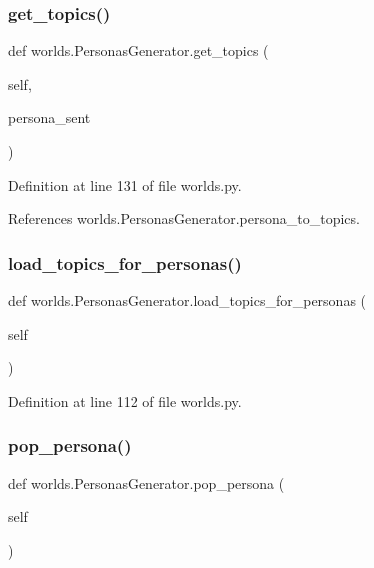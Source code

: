 \subsubsection{\texorpdfstring{get\+\_\+topics()}{get\_topics()}}
{\footnotesize\ttfamily def worlds.\+Personas\+Generator.\+get\+\_\+topics (\begin{DoxyParamCaption}\item[{}]{self,  }\item[{}]{persona\+\_\+sent }\end{DoxyParamCaption})}



Definition at line 131 of file worlds.\+py.



References worlds.\+Personas\+Generator.\+persona\+\_\+to\+\_\+topics.

\mbox{\label{classworlds_1_1PersonasGenerator_ac173abbfcad290ac88c504aea581c522}} 
\subsubsection{\texorpdfstring{load\+\_\+topics\+\_\+for\+\_\+personas()}{load\_topics\_for\_personas()}}
{\footnotesize\ttfamily def worlds.\+Personas\+Generator.\+load\+\_\+topics\+\_\+for\+\_\+personas (\begin{DoxyParamCaption}\item[{}]{self }\end{DoxyParamCaption})}



Definition at line 112 of file worlds.\+py.

\mbox{\label{classworlds_1_1PersonasGenerator_ada6f80abe6e9881a2ac225015531788c}} 
\subsubsection{\texorpdfstring{pop\+\_\+persona()}{pop\_persona()}\hspace{0.1cm}{\footnotesize\ttfamily [1/2]}}
{\footnotesize\ttfamily def worlds.\+Personas\+Generator.\+pop\+\_\+persona (\begin{DoxyParamCaption}\item[{}]{self }\end{DoxyParamCaption})}



